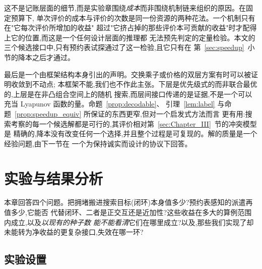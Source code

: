 \documentclass[manuscript,screen,review]{acmart}
\begin{document}
这不是记账层面的细节,而是实验章围绕\emph{成本}而非围绕机制链来组织的原因。在固定预算下,
单次评价的成本与评价的次数是同一份资源的两种花法。一个机制只有在"它每次评价所增加的收益"
超过"它挤占掉的那些评价本可贡献的收益"时才配得上它的位置,而这是一个任何设计层面的推理都
无法预先判定的定量检验。本文的三个候选接口中,只有预约表试探通过了这一检验,且它只有在
第~\ref{sec:speedup}~小节的降本之后才通过。

最后是一个由框架结构本身引出的声明。交换乘子或价格的双层方案有时可以被证明收敛到不动点;
本框架不能,我们也不作此主张。下层是优先级式的而非联合最优的,上层是在非凸组合空间上的随机
搜索,而层间接口传递的是证据,不是一个可以充当 Lyapunov 函数的量。命题~\ref{prop:decodable}、
引理~\ref{lem:label} 与命题~\ref{prop:speedup_equiv} 所保证的东西更窄,但对一个启发式方法而言
更有用:搜索考察的每一个候选解都是可行的,其评价相对第~\ref{sec:Chapter_III}~节的冲突模型是
精确的,降本没有改变任何一个选择,并且整个过程是可复现的。解的质量是一个经验问题,由下一节在
一个为保持诚实而设计的协议下回答。

\section{实验与结果分析}
\label{sec:Chapter_V}

本章回答四个问题。把拥堵搬进搜索目标(闭环)本身值多少?预约表感知的派遣再值多少,它能否
代替闭环、二者是正交互还是近加性?这些收益在多大的算例范围内成立,以及\emph{以现有的种子数
能不能看清}它们在哪里成立?以及,那些我们实现了却未能转为净收益的更复杂接口,失效在哪一环?

\subsection{实验设置}
\label{sec:instances}
\end{document}
